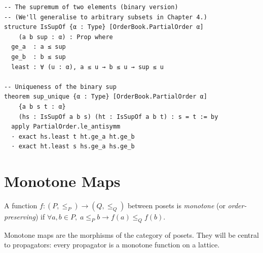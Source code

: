 \documentclass[12pt, a4paper, openright]{book}
\theoremstyle{thmstyle}
\theoremstyle{defstyle}
\newenvironment{defbox}[1][]{%
  \begin{tcolorbox}[defbox, title={Definition\ifx\\#1\\\else\ --- #1\fi}]%
}{\end{tcolorbox}}
\begin{document}
\begin{verbatim}
-- The supremum of two elements (binary version)
-- (We'll generalise to arbitrary subsets in Chapter 4.)
structure IsSupOf {α : Type} [OrderBook.PartialOrder α]
    (a b sup : α) : Prop where
  ge_a  : a ≤ sup
  ge_b  : b ≤ sup
  least : ∀ (u : α), a ≤ u → b ≤ u → sup ≤ u

-- Uniqueness of the binary sup
theorem sup_unique {α : Type} [OrderBook.PartialOrder α]
    {a b s t : α}
    (hs : IsSupOf a b s) (ht : IsSupOf a b t) : s = t := by
  apply PartialOrder.le_antisymm
  · exact hs.least t ht.ge_a ht.ge_b
  · exact ht.least s hs.ge_a hs.ge_b
\end{verbatim}

\section{Monotone Maps}

\begin{defbox}[Monotone Map]
  A function $f : (P, \leq_P) \to (Q, \leq_Q)$ between posets is
  \emph{monotone} (or \emph{order-preserving}) if
  $\forall a, b \in P,\; a \leq_P b \to f(a) \leq_Q f(b)$.
\end{defbox}

Monotone maps are the morphisms of the category of posets. They will be
central to propagators: every propagator is a monotone function on a lattice.
\end{document}
